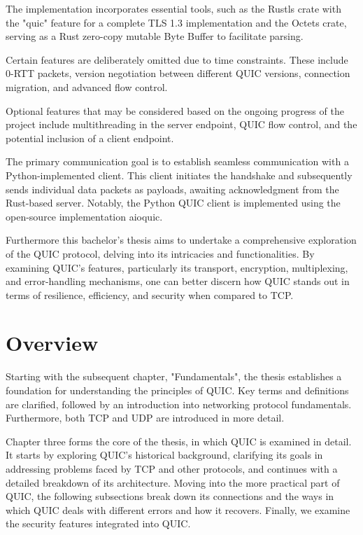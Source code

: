 The implementation incorporates essential tools, such as the Rustls crate with the "quic" feature for a complete TLS 1.3 implementation and the Octets crate, serving as a Rust zero-copy mutable Byte Buffer to facilitate parsing.

Certain features are deliberately omitted due to time constraints. These include 0-RTT packets, version negotiation between different QUIC versions, connection migration, and advanced flow control.

Optional features that may be considered based on the ongoing progress of the project include multithreading in the server endpoint, QUIC flow control, and the potential inclusion of a client endpoint.

The primary communication goal is to establish seamless communication with a Python-implemented client. This client initiates the handshake and subsequently sends individual data packets as payloads, awaiting acknowledgment from the Rust-based server. Notably, the Python QUIC client is implemented using the open-source implementation aioquic.

Furthermore this bachelor's thesis aims to undertake a comprehensive exploration of the QUIC protocol, delving into its intricacies and functionalities. By examining QUIC's features, particularly its transport, encryption, multiplexing, and error-handling mechanisms, one can better discern how QUIC stands out in terms of resilience, efficiency, and security when compared to TCP.

\section{Overview}

Starting with the subsequent chapter, "Fundamentals", the thesis establishes a foundation for understanding the principles of QUIC. Key terms and definitions are clarified, followed by an introduction into networking protocol fundamentals. Furthermore, both TCP and UDP are introduced in more detail.

Chapter three forms the core of the thesis, in which QUIC is examined in detail. It starts by exploring QUIC's historical background, clarifying its goals in addressing problems faced by TCP and other protocols, and continues with a detailed breakdown of its architecture. Moving into the more practical part of QUIC, the following subsections break down its connections and the ways in which QUIC deals with different errors and how it recovers. Finally, we examine the security features integrated into QUIC.

